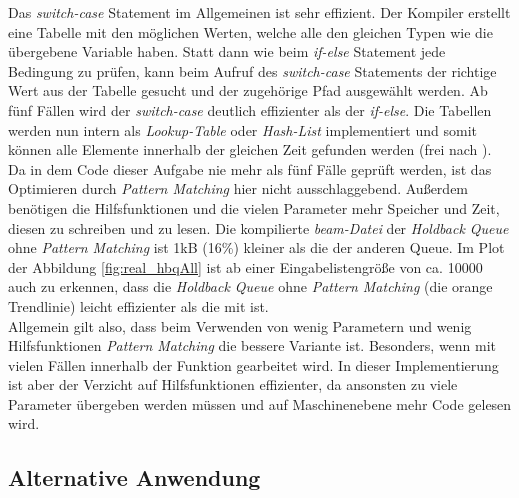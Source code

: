 \newpage
Das \textit{switch-case} Statement im Allgemeinen ist sehr effizient. Der Kompiler erstellt eine Tabelle mit den möglichen Werten, welche alle den gleichen Typen wie die übergebene Variable haben. Statt dann wie beim \textit{if-else} Statement jede Bedingung zu prüfen, kann beim Aufruf des \textit{switch-case} Statements der richtige Wert aus der Tabelle gesucht und der zugehörige Pfad ausgewählt werden. Ab fünf Fällen wird der \textit{switch-case} deutlich effizienter als der \textit{if-else}. Die Tabellen werden nun intern als \textit{Lookup-Table} oder \textit{Hash-List} implementiert und somit können alle Elemente innerhalb der gleichen Zeit gefunden werden (frei nach \cite{geeksforgeeks}). Da in dem Code dieser Aufgabe nie mehr als fünf Fälle geprüft werden, ist das Optimieren durch \textit{Pattern Matching} hier nicht ausschlaggebend. Außerdem benötigen die Hilfsfunktionen und die vielen Parameter mehr Speicher und Zeit, diesen zu schreiben und zu lesen. Die kompilierte \textit{beam-Datei} der \textit{Holdback Queue} ohne \textit{Pattern Matching} ist 1kB (16\%) kleiner als die der anderen Queue. Im Plot der Abbildung \ref{fig:real_hbqAll} ist ab einer Eingabelistengröße von ca. 10000 auch zu erkennen, dass die \textit{Holdback Queue} ohne \textit{Pattern Matching} (die orange Trendlinie) leicht effizienter als die mit ist. \\
Allgemein gilt also, dass beim Verwenden von wenig Parametern und wenig Hilfsfunktionen \textit{Pattern Matching} die bessere Variante ist. Besonders, wenn mit vielen Fällen innerhalb der Funktion gearbeitet wird. In dieser Implementierung ist aber der Verzicht auf Hilfsfunktionen effizienter, da ansonsten zu viele Parameter übergeben werden müssen und auf Maschinenebene mehr Code gelesen wird. 

\subsection{Alternative Anwendung}

